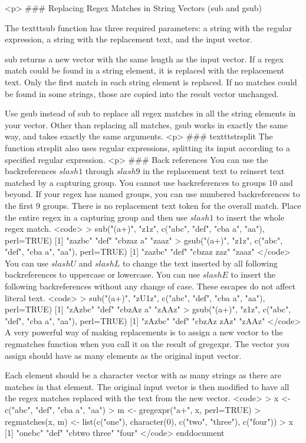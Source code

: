 <p>
### {Replacing Regex Matches in String Vectors (sub and gsub)}

The texttt{sub} function has three required parameters: a string with the regular expression, a string with the replacement text, and the input vector. 

sub returns a new vector with the same length as the input vector. If a regex match could be found in a string element, it is replaced with the replacement text. Only the first match in each string element is replaced. If no matches could be found in some strings, those are copied into the result vector unchanged.

Use gsub instead of sub to replace all regex matches in all the string elements in your vector. Other than replacing all matches, gsub works in exactly the same way, and takes exactly the same arguments.
<p>
### {texttt{strsplit}}
The function strsplit also uses regular expressions, splitting its input according to a specified regular expression.
<p>
### {Back references}
You can use the backreferences $slash 1$ through $slash 9$ in the replacement text to reinsert text matched by a capturing group. You cannot use backreferences to groups 10 and beyond. If your regex has named groups, you can use numbered backreferences to the first 9 groups. There is no replacement text token for the overall match. Place the entire regex in a capturing group and then use $slash 1$ to insert the whole regex match.
<code>
> sub("(a+)", "z1z", c("abc", "def", "cba a", "aa"), perl=TRUE)
[1] "zazbc"  "def"  "cbzaz a"   "zaaz"   
> gsub("(a+)", "z1z", c("abc", "def", "cba a", "aa"), perl=TRUE)
[1] "zazbc"  "def"  "cbzaz zaz" "zaaz"
</code>
You can use $slash U$ and $slash L$ to change the text inserted by all following backreferences to uppercase or lowercase. You can use $slash E$ to insert the following backreferences without any change of case. These escapes do not affect literal text.
<code>
> sub("(a+)", "zU1z", c("abc", "def", "cba a", "aa"), perl=TRUE)
[1] "zAzbc"  "def"  "cbzAz a"   "zAAz"   
> gsub("(a+)", "z1z", c("abc", "def", "cba a", "aa"), perl=TRUE)
[1] "zAzbc"  "def"  "cbzAz zAz" "zAAz"
</code>
A very powerful way of making replacements is to assign a new vector to the regmatches function when you call it on the result of gregexpr. The vector you assign should have as many elements as the original input vector. 

Each element should be a character vector with as many strings as there are matches in that element. The original input vector is then modified to have all the regex matches replaced with the text from the new vector.
<code>
> x <- c("abc", "def", "cba a", "aa")
> m <- gregexpr("a+", x, perl=TRUE)
> regmatches(x, m) <- list(c("one"), character(0), c("two", "three"), c("four"))
> x
[1]  "onebc"       "def"         "cbtwo three" "four"
</code>
end{document}

